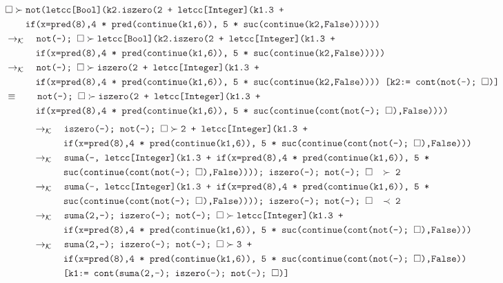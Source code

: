 \documentclass{article}
\newcommand{\tx}[1]{\textcolor{Black} {\texttt{#1}}}
\newcommand{\es}{$\square$}
\newcommand{\pop}[2]{ \tx{#1} \succ \tx{#2}}
\newcommand{\kr}{\rightarrow_{\mathcal{K}} \quad}
\begin{document}
\begin{enumerate}
\begin{enumerate}
			\begin{align*}
			&\pop{\es}{not(letcc[Bool](k2.iszero(2 + letcc[Integer](k1.3 +} \\
			&\tx{\quad \quad  if(x=pred(8),4 * pred(continue(k1,6)), 5 * suc(continue(k2,False))))))}\\
			&\kr \pop{not(-); \es}{letcc[Bool](k2.iszero(2 + letcc[Integer](k1.3 +} \\
			&\tx{\quad \quad \quad if(x=pred(8),4 * pred(continue(k1,6)), 5 * suc(continue(k2,False)))))}\\
			&\kr \pop{not(-); \es}{iszero(2 + letcc[Integer](k1.3 +} \\
			&\tx{\quad \quad \quad if(x=pred(8),4 * pred(continue(k1,6)), 5 * suc(continue(k2,False)))) [k2:= cont(not(-); \es)]}\\
			&\equiv \quad \quad \pop{not(-); \es}{iszero(2 + letcc[Integer](k1.3 +} \\
			&\tx{\quad \quad \quad if(x=pred(8),4 * pred(continue(k1,6)), 5 * suc(continue(cont(not(-); \es),False))))}\\		
			\end{align*}
			\begin{align*}			
			&\kr \pop{iszero(-); not(-); \es}{2 + letcc[Integer](k1.3 +} \\
			&\tx{\quad \quad \quad if(x=pred(8),4 * pred(continue(k1,6)), 5 * suc(continue(cont(not(-); \es),False)))}\\
			&\kr \tx{suma(-, letcc[Integer](k1.3 + if(x=pred(8),4 * pred(continue(k1,6)), 5 *}\\ &\tx{\quad \quad \quad suc(continue(cont(not(-); \es),False)))); iszero(-); not(-); \es $\quad \succ$ 2}\\
			&\kr \tx{suma(-, letcc[Integer](k1.3 + if(x=pred(8),4 * pred(continue(k1,6)), 5 *}\\ &\tx{\quad \quad \quad suc(continue(cont(not(-); \es),False)))); iszero(-); not(-); \es $\quad \prec$ 2}\\
			&\kr \pop{suma(2,-); iszero(-); not(-); \es}{letcc[Integer](k1.3 +}\\
			&\tx{\quad \quad \quad if(x=pred(8),4 * pred(continue(k1,6)), 5 * suc(continue(cont(not(-); \es),False)))}\\
			&\kr \pop{suma(2,-); iszero(-); not(-); \es}{3 +}\\
			&\tx{\quad \quad \quad if(x=pred(8),4 * pred(continue(k1,6)), 5 * suc(continue(cont(not(-); \es),False))}\\
			&\tx{\quad \quad \quad [k1:= cont(suma(2,-); iszero(-); not(-); \es)]}\\

\end{align*}
\end{enumerate}
\end{enumerate}
\end{document}
